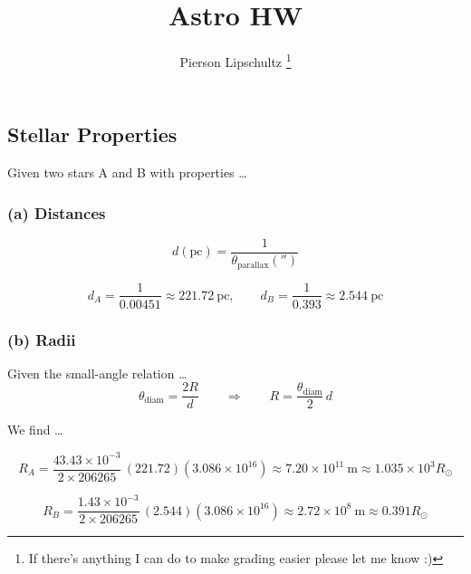 \documentclass{article}
\title{Astro HW \hwNUM}
\author{Pierson Lipschultz \thanks{If there's anything I can do to make grading easier please let me know :)}}
\def\hwNUM{8}
\begin{document}
\maketitle


\setcounter{section}{\hwNUM}
\subsection{Stellar Properties}

Given two stars A and B with properties \dots

\begin{table}[htbp]
\end{table}

\subsubsection*{(a) Distances}

\[
d(\mathrm{pc}) = \frac{1}{\theta_\mathrm{parallax}('')}
\]

\[
d_A = \frac{1}{0.00451} \boxed{\approx 221.72~\mathrm{pc}}, \qquad
d_B = \frac{1}{0.393} \boxed{\approx 2.544~\mathrm{pc}}
\]

\subsubsection*{(b) Radii}

Given the small-angle relation \dots
\[
\theta_\mathrm{diam} = \frac{2R}{d} \qquad \Rightarrow \qquad R = \frac{\theta_\mathrm{diam}}{2}\,d
\]

We find \dots

\[
R_A = \frac{43.43\times10^{-3}}{2\times206265}\,(221.72)(3.086\times10^{16})
   \boxed{\approx 7.20\times10^{11}~\mathrm{m}  \approx 1.035\times10^{3}R_\odot}
\]

\[
R_B = \frac{1.43\times10^{-3}}{2\times206265}\,(2.544)(3.086\times10^{16})
   \boxed{\approx 2.72\times10^{8}~\mathrm{m} \approx 0.391R_\odot}
\]
\end{document}
